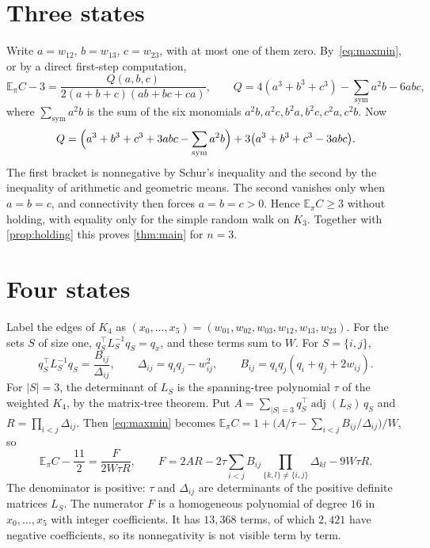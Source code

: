 \documentclass[11pt]{amsart}
\theoremstyle{remark}
\newcommand{\E}{\mathbb{E}}
\begin{document}
\section{Three states}\label{sec:three}

Write $a=w_{12}$, $b=w_{13}$, $c=w_{23}$, with at most one of them zero. By~\eqref{eq:maxmin}, or by a direct
first-step computation,
\begin{equation}\label{eq:three}
\E_\pi C-3=\frac{Q(a,b,c)}{2(a+b+c)(ab+bc+ca)},\qquad
Q=4(a^3+b^3+c^3)-\sum_{\mathrm{sym}}a^2b-6abc,
\end{equation}
where $\sum_{\mathrm{sym}}a^2b$ is the sum of the six monomials $a^2b,a^2c,b^2a,b^2c,c^2a,c^2b$. Now
\[
Q=\Bigl(a^3+b^3+c^3+3abc-\sum_{\mathrm{sym}}a^2b\Bigr)+3\bigl(a^3+b^3+c^3-3abc\bigr).
\]
The first bracket is nonnegative by Schur's inequality and the second by the inequality of arithmetic and geometric
means. The second vanishes only when $a=b=c$, and connectivity then forces $a=b=c>0$. Hence $\E_\pi C\ge3$ without
holding, with equality only for the simple random walk on $K_3$. Together with \cref{prop:holding} this proves
\cref{thm:main} for $n=3$.

\section{Four states}\label{sec:four}

Label the edges of $K_4$ as $(x_0,\dots,x_5)=(w_{01},w_{02},w_{03},w_{12},w_{13},w_{23})$. For the sets $S$ of size
one, $q_S^{\top}L_S^{-1}q_S=q_x$, and these terms sum to $W$. For $S=\{i,j\}$,
\[
q_S^{\top}L_S^{-1}q_S=\frac{B_{ij}}{\Delta_{ij}},\qquad \Delta_{ij}=q_iq_j-w_{ij}^2,\qquad
B_{ij}=q_iq_j(q_i+q_j+2w_{ij}).
\]
For $|S|=3$, the determinant of $L_S$ is the spanning-tree polynomial $\tau$ of the weighted $K_4$, by the matrix-tree
theorem. Put $A=\sum_{|S|=3}q_S^{\top}\operatorname{adj}(L_S)\,q_S$ and $R=\prod_{i<j}\Delta_{ij}$. Then
\eqref{eq:maxmin} becomes $\E_\pi C=1+\bigl(A/\tau-\sum_{i<j}B_{ij}/\Delta_{ij}\bigr)/W$, so
\begin{equation}\label{eq:F}
\E_\pi C-\frac{11}{2}=\frac{F}{2W\tau R},\qquad
F=2AR-2\tau\sum_{i<j}B_{ij}\prod_{\{k,l\}\ne\{i,j\}}\Delta_{kl}-9W\tau R .
\end{equation}
The denominator is positive: $\tau$ and $\Delta_{ij}$ are determinants of the positive definite matrices $L_S$. The
numerator $F$ is a homogeneous polynomial of degree $16$ in $x_0,\dots,x_5$ with integer coefficients. It has
$13{,}368$ terms, of which $2{,}421$ have negative coefficients, so its nonnegativity is not visible term by term.
\end{document}
